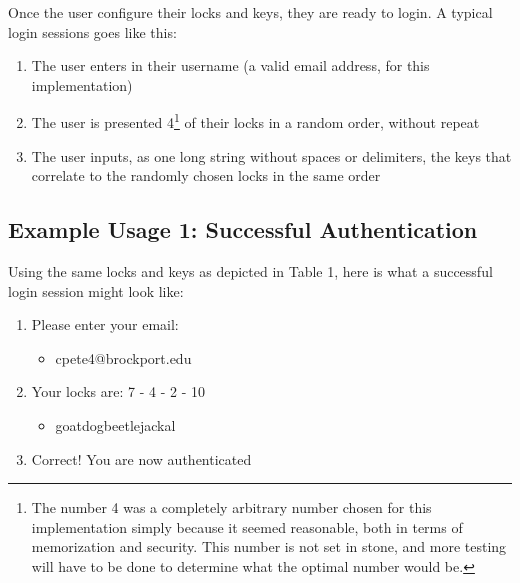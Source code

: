 \documentclass[conference]{IEEEtran}
\begin{document}
	Once the user configure their locks and keys, they are ready to login. A typical login sessions goes like this:
	\begin{enumerate}
		\item The user enters in their username (a valid email address, for this implementation)
		\item The user is presented 4\footnote{The number 4 was a completely arbitrary number chosen for this implementation simply because it seemed reasonable, both in terms of memorization and security. This number is not set in stone, and more testing will have to be done to determine what the optimal number would be.} of their locks in a random order, without repeat
		\item The user inputs, as one long string without spaces or delimiters, the keys that correlate to the randomly chosen locks in the same order
	\end{enumerate}
\subsection{Example Usage 1: Successful Authentication}
	Using the same locks and keys as depicted in Table 1, here is what a successful login session might look like:
	\begin{enumerate}
		\item Please enter your email:
		\begin{itemize}
			\item cpete4@brockport.edu
		\end{itemize}
		\item Your locks are: 7 - 4 - 2 - 10
		\begin{itemize}
			\item goatdogbeetlejackal
		\end{itemize}
		\item Correct! You are now authenticated
	\end{enumerate}
\end{document}
